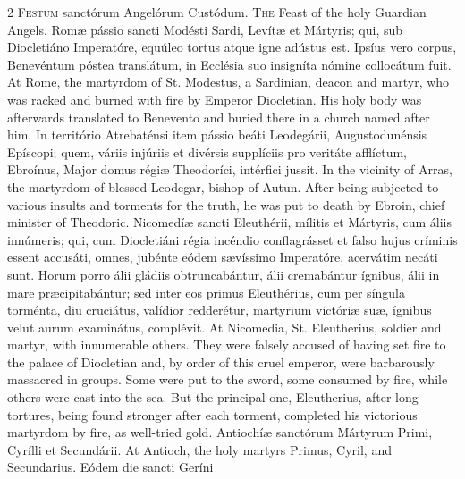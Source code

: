 \begin{paracol}{2}
\lettrine[lines=1]{F}{estum} sanctórum Angelórum Custódum.
\switchcolumn
{}
\lettrine[lines=1]{T}{he} Feast of the holy Guardian Angels.
\switchcolumn*
{}
Romæ pássio sancti 
 Modésti Sardi, Levítæ et Mártyris; qui, sub Diocletiáno Imperatóre, equúleo 
 tortus atque igne adústus est. Ipsíus vero corpus, Benevéntum póstea 
 translátum, in Ecclésia suo insigníta nómine collocátum fuit.
\switchcolumn
{}
At Rome, the martyrdom of St. 
 Modestus, a Sardinian, deacon and martyr, who was racked and burned with 
 fire by Emperor Diocletian. His holy body was afterwards translated to 
 Benevento and buried there in a church named after him.
\switchcolumn*
{}
In território 
 Atrebaténsi item pássio beáti Leodegárii, Augustodunénsis Epíscopi; quem, 
 váriis injúriis et divérsis supplíciis pro veritáte afflíctum, Ebroínus, 
 Major domus régiæ Theodoríci, intérfici jussit.
\switchcolumn
{}
In the vicinity of Arras, the 
 martyrdom of blessed Leodegar, bishop of Autun. After being 
 subjected to various insults and torments for the truth, he was put to death 
 by Ebroin, chief minister of Theodoric.
\switchcolumn*
{}
Nicomedíæ sancti 
 Eleuthérii, mílitis et Mártyris, cum áliis innúmeris; qui, cum Diocletiáni 
 régia incéndio conflagrásset et falso hujus críminis essent accusáti, omnes, 
 jubénte eódem sævíssimo Imperatóre, acervátim necáti sunt. Horum porro 
 álii gládiis obtruncabántur, álii cremabántur ígnibus, álii in mare 
 præcipitabántur; sed inter eos primus Eleuthérius, cum per síngula torménta, 
 diu cruciátus, valídior redderétur, martyrium victóriæ suæ, ígnibus 
 velut aurum examinátus, complévit.
\switchcolumn
{}
At Nicomedia, St. Eleutherius, 
 soldier and martyr, with innumerable others. They were falsely accused 
 of having set fire to the palace of Diocletian and, by order of this cruel 
 emperor, were barbarously massacred in groups. Some were put to the 
 sword, some consumed by fire, while others were cast into the sea. But 
 the principal one, Eleutherius, after long tortures, being found stronger 
 after each torment, completed his victorious martyrdom by fire, as 
 well-tried gold.
\switchcolumn*
{}
Antiochíæ sanctórum 
 Mártyrum Primi, Cyrílli et Secundárii.
\switchcolumn
{}
At Antioch, the holy martyrs Primus, 
 Cyril, and Secundarius.
\switchcolumn*
{}
Eódem die sancti Geríni 

\end{paracol}
